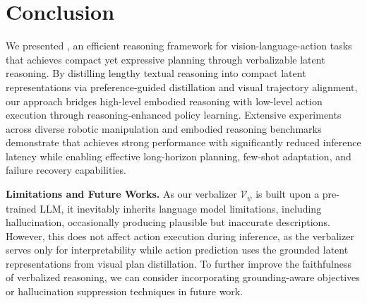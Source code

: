 \section{Conclusion}
\label{sec:conclusion}

We presented \textit{\ours{}}, an efficient reasoning framework for vision-language-action tasks that achieves compact yet expressive planning through verbalizable latent reasoning. By distilling lengthy textual reasoning into compact latent representations via preference-guided distillation and visual trajectory alignment, our approach bridges high-level embodied reasoning with low-level action execution through reasoning-enhanced policy learning. Extensive experiments across diverse robotic manipulation and embodied reasoning benchmarks demonstrate that \ours{} achieves strong performance with significantly reduced inference latency while enabling effective long-horizon planning, few-shot adaptation, and failure recovery capabilities.

\noindent\textbf{Limitations and Future Works.} As our verbalizer $\mathcal{V}_\psi$ is built upon a pre-trained LLM, it inevitably inherits language model limitations, including hallucination, occasionally producing plausible but inaccurate descriptions. However, this does not affect action execution during inference, as the verbalizer serves only for interpretability while action prediction uses the grounded latent representations from visual plan distillation. To further improve the faithfulness of verbalized reasoning, we can consider incorporating grounding-aware objectives or hallucination suppression techniques in future work.